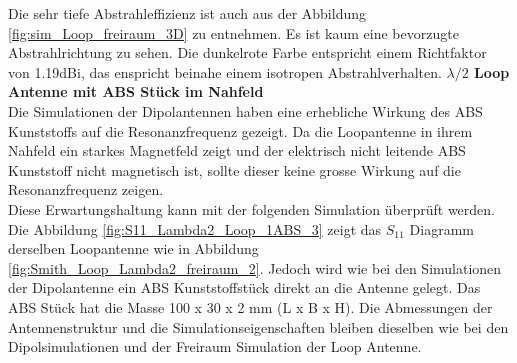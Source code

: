 Die sehr tiefe Abstrahleffizienz ist auch aus der Abbildung \ref{fig:sim_Loop_freiraum_3D} zu entnehmen. Es ist kaum eine bevorzugte Abstrahlrichtung zu sehen. Die dunkelrote Farbe entspricht einem Richtfaktor von 1.19dBi, das enspricht beinahe einem isotropen Abstrahlverhalten.
\newpage
\textbf{$\lambda/2$ Loop Antenne mit ABS Stück im Nahfeld}\\
Die Simulationen der Dipolantennen haben eine erhebliche Wirkung des ABS Kunststoffs auf die Resonanzfrequenz gezeigt. Da die Loopantenne in ihrem Nahfeld ein starkes Magnetfeld zeigt und der elektrisch nicht leitende ABS Kunststoff nicht magnetisch ist, sollte dieser keine grosse Wirkung auf die Resonanzfrequenz zeigen.\\ Diese Erwartungshaltung kann mit der folgenden Simulation überprüft werden.\\
 
Die Abbildung \ref{fig:S11_Lambda2_Loop_1ABS_3} zeigt das $S_{11}$ Diagramm derselben Loopantenne wie in Abbildung \ref{fig:Smith_Loop_Lambda2_freiraum_2}. Jedoch wird wie bei den Simulationen der Dipolantenne ein ABS Kunststoffstück direkt an die Antenne gelegt. Das ABS Stück hat die Masse 100 x 30 x 2 mm (L x B x H). Die Abmessungen der Antennenstruktur und die Simulationseigenschaften bleiben dieselben wie bei den Dipolsimulationen und der Freiraum Simulation der Loop Antenne.\\

